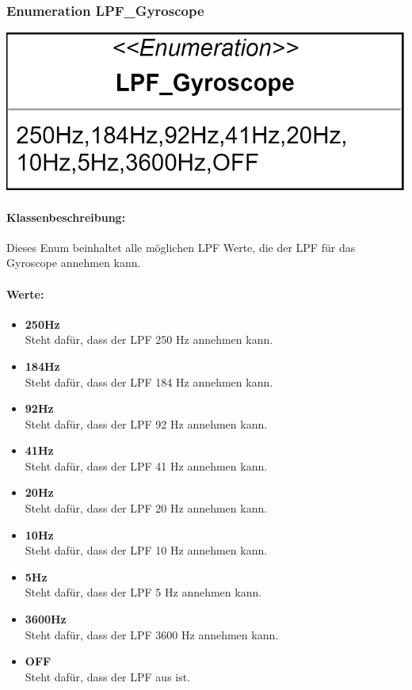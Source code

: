 \documentclass[a4paper,12pt]{article}
\begin{document}
\begin{minipage}[t]{0.7\textwidth}
	\subsubsection{Enumeration LPF\_Gyroscope}
	\end{minipage}
	\begin{minipage}[c]{0.3\textwidth}
	\includegraphics[width=\textwidth]{bilder/BibPackageKlassen/LPF_Gyrosope.png}
\end{minipage}

\paragraph{Klassenbeschreibung:}
Dieses Enum beinhaltet alle möglichen LPF Werte, die der LPF für das Gyroscope annehmen kann.

\paragraph{Werte:}
\begin{itemize}
	\item \textbf{250Hz}\\Steht dafür, dass der LPF 250 Hz annehmen kann.
	\item \textbf{184Hz}\\Steht dafür, dass der LPF 184 Hz annehmen kann.
	\item \textbf{92Hz}\\Steht dafür, dass der LPF 92 Hz annehmen kann.
	\item \textbf{41Hz}\\Steht dafür, dass der LPF 41 Hz annehmen kann.
	\item \textbf{20Hz}\\Steht dafür, dass der LPF 20 Hz annehmen kann.
	\item \textbf{10Hz}\\Steht dafür, dass der LPF 10 Hz annehmen kann.
	\item \textbf{5Hz}\\Steht dafür, dass der LPF 5 Hz annehmen kann.
	\item \textbf{3600Hz}\\Steht dafür, dass der LPF 3600 Hz annehmen kann.
	\item \textbf{OFF}\\Steht dafür, dass der LPF aus ist.\\
\end{itemize}
\end{document}

